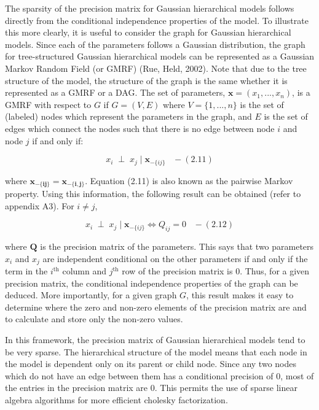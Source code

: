 \documentclass[]{article}
\begin{document}
The sparsity of the precision matrix for Gaussian hierarchical models
follows directly from the conditional independence properties of the
model. To illustrate this more clearly, it is useful to consider the
graph for Gaussian hierarchical models. Since each of the parameters
follows a Gaussian distribution, the graph for tree-structured Gaussian
hierarchical models can be represented as a Gaussian Markov Random Field
(or GMRF) (Rue, Held, 2002). Note that due to the tree structure of the
model, the structure of the graph is the same whether it is represented
as a GMRF or a DAG. The set of parameters,
\(\boldsymbol{x} = (x_1, ..., x_n)\), is a GMRF with respect to \(G\) if
\(G = (V,E)\) where \(V = \{1,...,n\}\) is the set of (labeled) nodes
which represent the parameters in the graph, and \(E\) is the set of
edges which connect the nodes such that there is no edge between node
\(i\) and node \(j\) if and only if:

\[x_i \; \perp \; x_j \;|\; \boldsymbol{x}_{-\{ij\}} \;\;\; - (2.11)\]

where \(\boldsymbol{x_{-\{ij\}}} = \boldsymbol{x_{-\{i,j\}}}\). Equation
(2.11) is also known as the pairwise Markov property. Using this
information, the following result can be obtained (refer to appendix
A3). For \(i \neq j\),

\[x_i \; \perp \; x_j \;|\; \boldsymbol{x}_{-\{ij\}} \iff Q_{ij}=0 \;\;\; - (2.12)\]

where \(\boldsymbol{Q}\) is the precision matrix of the parameters. This
says that two parameters \(x_i\) and \(x_j\) are independent conditional
on the other parameters if and only if the term in the \(i^{\text{th}}\)
column and \(j^{\text{th}}\) row of the precision matrix is 0. Thus, for
a given precision matrix, the conditional independence properties of the
graph can be deduced. More importantly, for a given graph \(G\), this
result makes it easy to determine where the zero and non-zero elements
of the precision matrix are and to calculate and store only the non-zero
values.

In this framework, the precision matrix of Gaussian hierarchical models
tend to be very sparse. The hierarchical structure of the model means
that each node in the model is dependent only on its parent or child
node. Since any two nodes which do not have an edge between them has a
conditional precision of 0, most of the entries in the precision matrix
are 0. This permits the use of sparse linear algebra algorithms for more
efficient cholesky factorization. \newline \newline \newline
\end{document}
